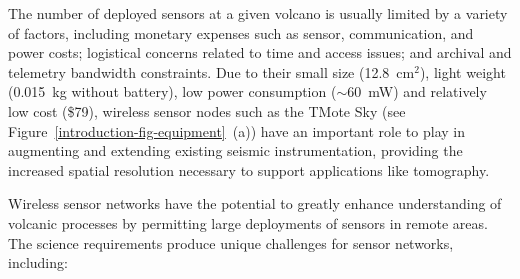 The number of deployed sensors at a given volcano is usually limited by a
variety of factors, including monetary expenses such as sensor,
communication, and power costs; logistical concerns related to time and
access issues; and archival and telemetry bandwidth constraints. Due to their
small size (12.8~$\mathrm{cm}^2$), light weight (0.015~kg without battery),
low power consumption ($\sim$60~mW) and relatively low cost (\$79), wireless
sensor nodes such as the TMote Sky (see
Figure~\ref{introduction-fig-equipment}~(a)) have an important role to play
in augmenting and extending existing seismic instrumentation, providing the
increased spatial resolution necessary to support applications like
tomography.

Wireless sensor networks have the potential to greatly enhance understanding
of volcanic processes by permitting large deployments of sensors in remote
areas. The science requirements produce unique challenges for sensor
networks, including:

\vfill\eject

